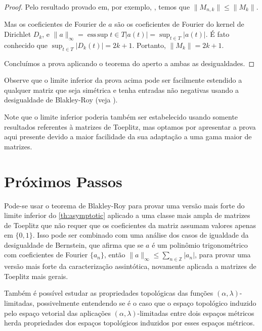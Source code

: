 \documentclass[a4paper,12pt]{article}
\DeclareMathOperator*{\esssup}{ess\,sup}
\newtheorem{theorem}{Teorema}
\theoremstyle{definition}
\begin{document}
\begin{proof}
  Pelo resultado provado em, por exemplo, \cite[p. 52]{bottcher}, temos que $\| M_{n,k} \| \le \| M_k \|$.

  Mas os coeficientes de Fourier de $a$ são os coeficientes de Fourier do kernel de Dirichlet $D_k$, e $\| a \|_{\infty} = \esssup{t \in T} \lvert a(t)\rvert = \sup_{t \in T} \lvert a(t)\rvert$. É fato conhecido que $\sup_{t \in T} \lvert D_k(t)\rvert = 2k + 1$. Portanto, $\| M_k \| = 2k + 1$.

  Concluímos a prova aplicando o teorema do aperto a ambas as desigualdades. \end{proof}

Observe que o limite inferior da prova acima pode ser facilmente estendido a qualquer matriz que seja simétrica e tenha entradas não negativas usando a desigualdade de Blakley-Roy (veja \cite{blakley-roy}).

Note que o limite inferior poderia também ser estabelecido usando somente resultados referentes à matrizes de Toeplitz, mas optamos por apresentar a prova aqui presente devido a maior facilidade da sua adaptação a uma gama maior de matrizes.



\newpage
\section*{Próximos Passos}
\vspace{1cm}

Pode-se usar o teorema de Blakley-Roy para provar uma versão mais forte do limite inferior do \ref*{th:asymptotic} aplicado a uma classe mais ampla de matrizes de Toeplitz que não requer que os coeficientes da matriz assumam valores apenas em $\{0, 1\}$. Isso pode ser combinado com uma análise dos casos de igualdade da desigualdade de Bernstein, que afirma que se $a$ é um polinômio trigonométrico com coeficientes de Fourier $\{a_n\}$, então $\|a\|_\infty \le \sum_{n \in \mathbb{Z}} \lvert a_n\rvert$, para provar uma versão mais forte da caracterização assintótica, novamente aplicada a matrizes de Toeplitz mais gerais.

Também é possível estudar as propriedades topológicas das funções $(\alpha, \lambda)$-limitadas, possivelmente entendendo se é o caso que o espaço topológico induzido pelo espaço vetorial das aplicações $(\alpha, \lambda)$-limitadas entre dois espaços métricos herda propriedades dos espaços topológicos induzidos por esses espaços métricos.
\end{document}
